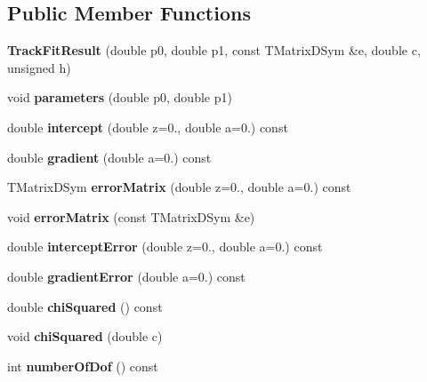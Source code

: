 \subsection*{Public Member Functions}
\begin{DoxyCompactItemize}
\item 
{\bfseries Track\-Fit\-Result} (double p0, double p1, const T\-Matrix\-D\-Sym \&e, double c, unsigned h)\label{classTBTrack_1_1TrackFitResult_a9be66e8f2f6a85ee13202b35b3e49698}

\item 
void {\bfseries parameters} (double p0, double p1)\label{classTBTrack_1_1TrackFitResult_ad13aa283509c0e7ddca6815ef7a1cc57}

\item 
double {\bfseries intercept} (double z=0., double a=0.) const \label{classTBTrack_1_1TrackFitResult_a7fbbf8ae46fa2ede02b6e9993608bf00}

\item 
double {\bfseries gradient} (double a=0.) const \label{classTBTrack_1_1TrackFitResult_a4a5441700a888610c735ee01fd13e6d9}

\item 
T\-Matrix\-D\-Sym {\bfseries error\-Matrix} (double z=0., double a=0.) const \label{classTBTrack_1_1TrackFitResult_a2c0e2dafabfbc64f26dd27497ea2fd75}

\item 
void {\bfseries error\-Matrix} (const T\-Matrix\-D\-Sym \&e)\label{classTBTrack_1_1TrackFitResult_ae70ea377e10c83a093cfc33680958f14}

\item 
double {\bfseries intercept\-Error} (double z=0., double a=0.) const \label{classTBTrack_1_1TrackFitResult_ae6cb4a2bba4e7f0e3fd18a764b7af88f}

\item 
double {\bfseries gradient\-Error} (double a=0.) const \label{classTBTrack_1_1TrackFitResult_a41f9c1f909254c6f08c2e755b15fd0c1}

\item 
double {\bfseries chi\-Squared} () const \label{classTBTrack_1_1TrackFitResult_a6e664b5e02b50c77e7036d0f500f8b86}

\item 
void {\bfseries chi\-Squared} (double c)\label{classTBTrack_1_1TrackFitResult_a6be030fd4473e6b5f1c49d3818e3449b}

\item 
int {\bfseries number\-Of\-Dof} () const \label{classTBTrack_1_1TrackFitResult_a1384e826d2e5e24b8edd6cf5ae3350d9}


\end{DoxyCompactItemize}
